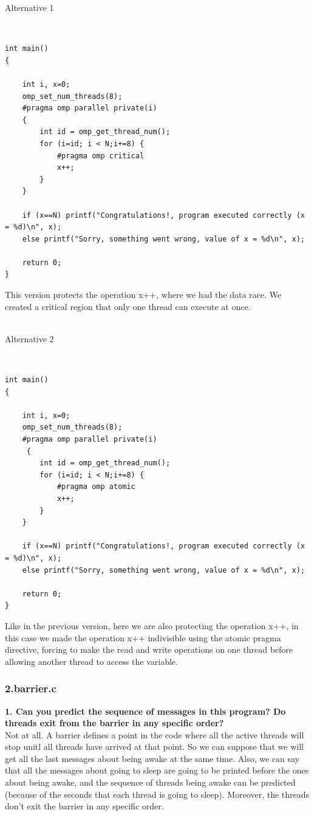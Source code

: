 \documentclass[12]{article}
\begin{document}
\begin{Large}
Alternative 1
\end{Large}
\\
\begin{lstlisting}[frame=single]
int main()
{

    int i, x=0;
    omp_set_num_threads(8);
    #pragma omp parallel private(i)
    {
    	int id = omp_get_thread_num();
    	for (i=id; i < N;i+=8) {
        	#pragma omp critical
        	x++;
    	}
	}

    if (x==N) printf("Congratulations!, program executed correctly (x = %d)\n", x);
    else printf("Sorry, something went wrong, value of x = %d\n", x);

    return 0;
}  
\end{lstlisting}  
This version protects the operation x++, where we had the data race. We created a critical region that only one thread can execute at once.
\\
\\
\medskip
\begin{Large}
Alternative 2
\end{Large}
\\
\begin{lstlisting}[frame=single]
int main()
{

    int i, x=0;
    omp_set_num_threads(8);
    #pragma omp parallel private(i)
     {
    	int id = omp_get_thread_num();
   		for (i=id; i < N;i+=8) {
        	#pragma omp atomic
        	x++;
    	}
	}

    if (x==N) printf("Congratulations!, program executed correctly (x = %d)\n", x);
    else printf("Sorry, something went wrong, value of x = %d\n", x);

    return 0;
}
\end{lstlisting}
Like in the previous version, here we are also protecting the operation x++, in this case we made the operation x++ indivisible using the atomic pragma directive, forcing to make the read and write operations on one thread before allowing another thread to access the variable. 

\subsubsection{2.barrier.c}
\textbf{1. Can you predict the sequence of messages in this program? Do threads exit from the barrier
in any specific order?} 
\\
Not at all.
A barrier defines a point in the code where all the active threads will stop unitl all threads have arrived at that point. So we can suppose that we will get all the last messages about being awake at the same time. Also, we can say that all the messages about going to sleep are going to be printed before the ones about being awake, and the sequence of threads being awake can be predicted (because of the seconds that each thread is going to sleep). Moreover, the threads don't exit the barrier in any specific order. 
\end{document}
